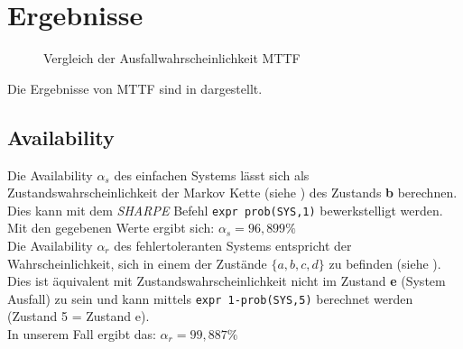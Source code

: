 \documentclass[
            a4paper
            ]{scrartcl}%
\begin{document}
\section{Ergebnisse}
\begin{figure}
\centering
{}
\caption{Vergleich der Ausfallwahrscheinlichkeit MTTF}
\label{fig:mttf_result}
\end{figure}
Die Ergebnisse von MTTF sind in  dargestellt.

\subsection{Availability}
Die Availability $\alpha_s$ des einfachen Systems lässt sich als Zustandswahrscheinlichkeit der Markov Kette (siehe ) des Zustands \textbf{b} berechnen. Dies kann mit dem \emph{SHARPE} Befehl \mbox{\texttt{expr prob(SYS,1)}} bewerkstelligt werden. \\
Mit den gegebenen Werte ergibt sich: $\alpha_s = 96,899\%$\\

Die Availability $\alpha_r$ des fehlertoleranten Systems entspricht der Wahrscheinlichkeit, sich in einem der Zustände $\lbrace a, b, c, d \rbrace$ zu befinden (siehe ). Dies ist äquivalent mit Zustandswahrscheinlichkeit nicht im Zustand \textbf{e} (System Ausfall) zu sein und kann mittels \mbox{\texttt{expr 1-prob(SYS,5)}} berechnet werden (Zustand 5 = Zustand e).\\
In unserem Fall ergibt das: $\alpha_r = 99,887\%$\\
\end{document}
